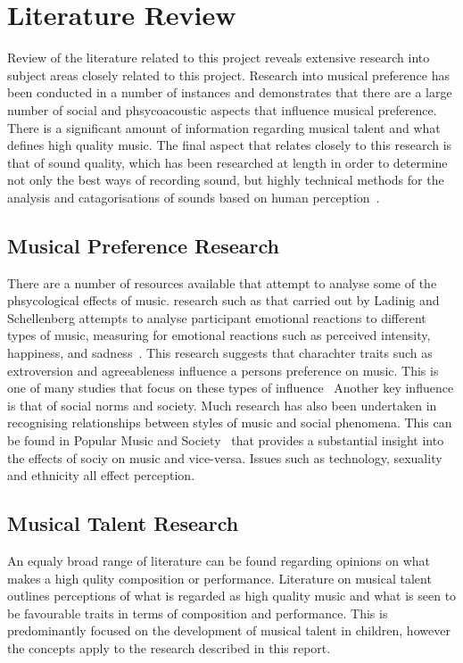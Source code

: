 \documentclass[titlepage]{scrartcl}
\begin{document}
    \section{Literature Review}\label{LR}
    Review of the literature related to this project reveals extensive research
    into subject areas closely related to this project. Research into musical
    preference has been conducted in a number of instances and demonstrates
    that there are a large number of social and phsycoacoustic aspects that
    influence musical preference. There is a significant amount of
    information regarding musical talent and what defines high quality music.
    The final aspect that relates closely to this research is that of sound
    quality, which has been researched at length in order to determine not only
    the best ways of recording sound, but highly technical methods for the
    analysis and catagorisations of sounds based on human
    perception~\parencite{hal}.

    \subsection{Musical Preference Research}
    There are a number of resources available that attempt to analyse some of
    the phsycological effects of music. research such as that carried out by
    Ladinig and Schellenberg attempts to analyse participant emotional
    reactions to different types of music, measuring for emotional reactions
    such as perceived intensity, happiness, and sadness~\parencite{lum}. This
    research suggests that charachter traits such as extroversion and
    agreeableness influence a persons preference on music. This is one of many
    studies that focus on these types of
    influence~\parencite{kessler2004semmp,eamim}
    Another key influence is that of social norms and society. Much research
    has also been undertaken in recognising relationships between styles of
    music and social phenomena. This can be found in Popular Music and
    Society~\parencite{longhurst2007pmas} that provides a substantial insight
    into the effects of sociy on music and vice-versa. Issues such as
    technology, sexuality and ethnicity all effect perception.
    
    \subsection{Musical Talent Research}
    An equaly broad range of literature can be found regarding opinions on what
    makes a high qulity composition or performance. Literature on musical
    talent outlines perceptions of what is regarded as high quality music and
    what is seen to be favourable traits in terms of composition and
    performance. This is predominantly focused on the development of musical
    talent in children, however the concepts apply to the research described in
    this report.~\parencite{spark, hoffman2015blessed, kingsbury2001mtp}
\end{document}
